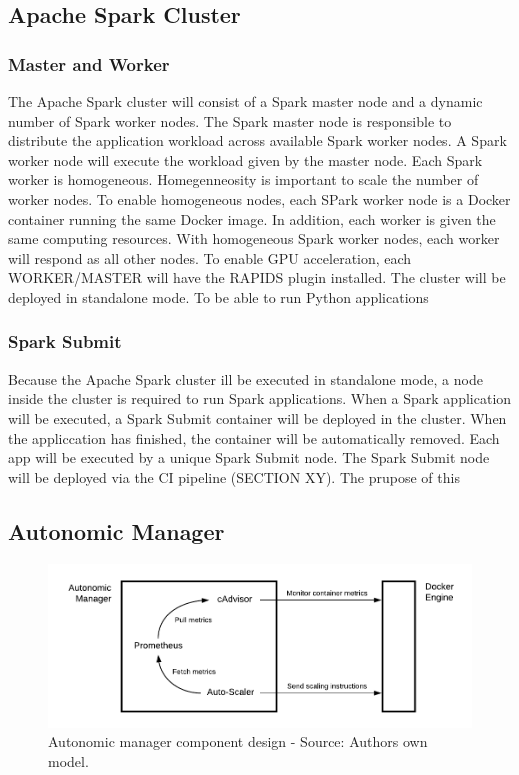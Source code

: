 \subsection{Apache Spark Cluster}
\label{subsec:05_arch_spark}


\subsubsection{Master and Worker}
The Apache Spark cluster will consist of a Spark master node and a dynamic number of Spark worker nodes.
The Spark master node is responsible to distribute the application workload across available Spark worker nodes.
A Spark worker node will execute the workload given by the master node. Each Spark worker is homogeneous. 
Homegenneosity is important to scale the number of worker nodes. To enable homogeneous nodes, each SPark worker node is a Docker container running the same Docker image. In addition, each worker is given the same computing resources. With homogeneous Spark worker nodes, each worker will respond as all other nodes.
To enable GPU acceleration, each WORKER/MASTER will have the RAPIDS plugin installed.
The cluster will be deployed in standalone mode. To be able to run Python applications


\subsubsection{Spark Submit}
Because the Apache Spark cluster ill be executed in standalone mode, a node inside the cluster is required to run Spark applications. When a Spark application will be executed, a Spark Submit container will be deployed in the cluster. When the appliccation has finished, the container will be automatically removed.
Each app will be executed by a unique Spark Submit node.
The Spark Submit node will be deployed via the CI pipeline (SECTION XY). The prupose of this 


\subsection{Autonomic Manager}
\label{subsec:05_arch_am}

\begin{figure}[h]
\centering
\includegraphics[scale=0.85]{images/05_conceptual_design/autonomic_manager/autonomic_manager_overview}
\caption{Autonomic manager component design - Source: Authors own model.}
\label{fig:am-design-component}
\end{figure}

